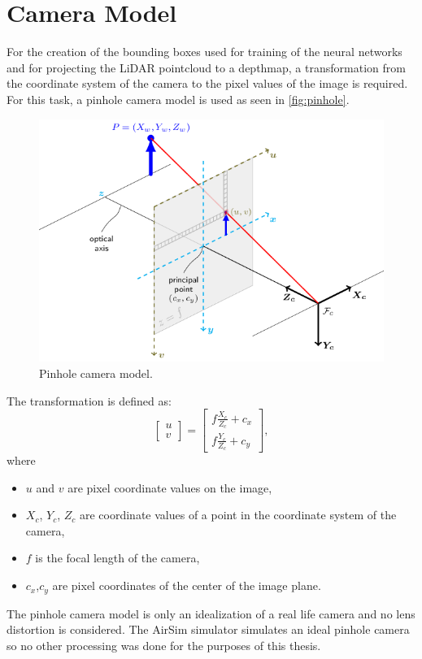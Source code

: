 \documentclass[twoside]{ctuthesis}
\theoremstyle{plain}
\theoremstyle{definition}
\theoremstyle{note}
\begin{document}
\section{Camera Model} \label{sec:camera-model}
For the creation of the bounding boxes used for training of the neural networks and for projecting the LiDAR pointcloud to a depthmap, a transformation from the coordinate system of the camera to the pixel values of the image is required. For this task, a pinhole camera model is used as seen in \autoref{fig:pinhole}.
\begin{figure}
	\centering
	\includegraphics[width=\textwidth]{pinhole_camera_model.png}
	\caption[Pinhole camera model.]{Pinhole camera model\footnotemark.}
	\label{fig:pinhole}
\end{figure}
The transformation is defined as:
\begin{equation} \label{eq:2}
	\begin{bmatrix}
		u\\
		v
	\end{bmatrix}=
	\begin{bmatrix}
		f\frac{X_c}{Z_c}+c_x\\
		f\frac{Y_c}{Z_c}+c_y
	\end{bmatrix},
\end{equation}
where
\begin{itemize}
	\item $u$ and $v$ are pixel coordinate values on the image,
	\item $X_c$, $Y_c$, $Z_c$ are coordinate values of a point in the coordinate system of the camera,
	\item $f$ is the focal length of the camera,
	\item $c_x$,$c_y$ are pixel coordinates of the center of the image plane.
\end{itemize}
The pinhole camera model is only an idealization of a real life camera and no lens distortion is considered. The AirSim simulator simulates an ideal pinhole camera so no other processing was done for the purposes of this thesis.
\end{document}
